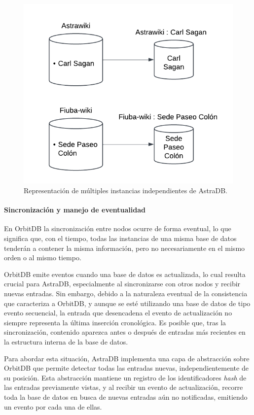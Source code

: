 \begin{figure}[H]
\centering
\includegraphics[width=0.6\linewidth]{img/solucion-ipfs/bdd-multiple.png}
\caption{Representación de múltiples instancias independientes de AstraDB.}
\label{fig:bdd-multiple}
\end{figure}

\paragraph{Sincronización y manejo de eventualidad}

En OrbitDB la sincronización entre nodos ocurre de forma eventual, lo que significa que, con el tiempo, todas las instancias de una misma base de datos tenderán a contener la misma información, pero no necesariamente en el mismo orden o al mismo tiempo.

OrbitDB emite eventos cuando una base de datos es actualizada, lo cual resulta crucial para AstraDB, especialmente al sincronizarse con otros nodos y recibir nuevas entradas. Sin embargo, debido a la naturaleza eventual de la consistencia que caracteriza a OrbitDB, y aunque se esté utilizando una base de datos de tipo evento secuencial, la entrada que desencadena el evento de actualización no siempre representa la última inserción cronológica. Es posible que, tras la sincronización, contenido aparezca antes o después de entradas más recientes en la estructura interna de la base de datos.

Para abordar esta situación, AstraDB implementa una capa de abstracción sobre OrbitDB que permite detectar todas las entradas nuevas, independientemente de su posición. Esta abstracción mantiene un registro de los identificadores \textit{hash} de las entradas previamente vistas, y al recibir un evento de actualización, recorre toda la base de datos en busca de nuevas entradas aún no notificadas, emitiendo un evento por cada una de ellas.

